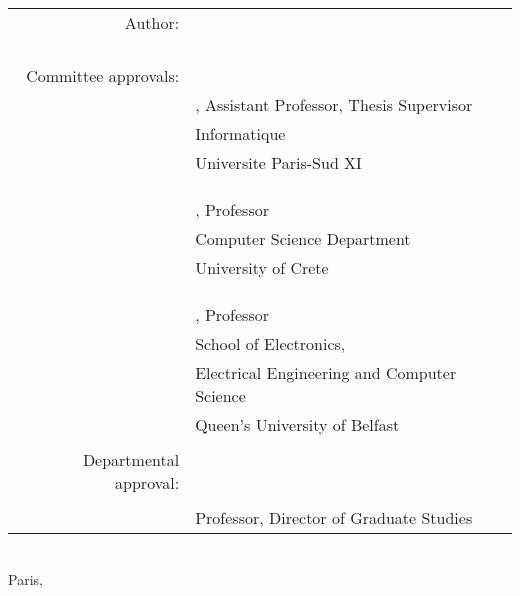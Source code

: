 \begin{titlepage}
\begin{center}
\begin{tabular}{rl}
\\
Author: & \underline{\phantom{123456789012345678901234567890123456789012}}\\
    & \owner{}\\
    \\
    \\
    \\
Committee approvals: & \underline{\phantom{123456789012345678901234567890123456789012}}\\
    & \firstprof{}, Assistant Professor, Thesis Supervisor\\
    & {\small Informatique}\\
    & {\small Universite Paris-Sud XI}\\
    \vspace{0.2cm}
    \\
    \\
& \underline{\phantom{123456789012345678901234567890123456789012}}\\
    & \secondprof{}, Professor\\
    & {\small Computer Science Department}\\
		& {\small University of Crete}\\
    \vspace{0.2cm}
    \\
    \\
& \underline{\phantom{123456789012345678901234567890123456789012}}\\
    & \thirdprof{}, Professor\\
    & {\small School of Electronics,}\\
		& {\small	Electrical Engineering and Computer Science}\\
    & {\small Queen's University of Belfast}
    \vspace{0.2cm}
    \\
    \\
\hspace{1.4ex}Departmental approval: & \underline{\phantom{123456789012345678901234567890123456789012}}\\
    & \chair{}\\
    & {\small  Professor, Director of Graduate Studies}\\
\end{tabular}
\\

\vfill
Paris, \thesisdate{}
\end{center}

\thispagestyle{empty}

\end{titlepage}

